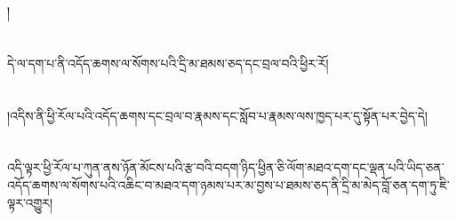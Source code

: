 །\chapter{ }དེ་ལ་དག་པ་ནི་འདོད་ཆགས་ལ་སོགས་པའི་དྲི་མ་ཐམས་ཅད་དང་བྲལ་བའི་ཕྱིར་རོ།\chapter{ }།འདིས་ནི་ཕྱི་རོལ་པའི་འདོད་ཆགས་དང་བྲལ་བ་རྣམས་དང་སློབ་པ་རྣམས་ལས་ཁྱད་པར་དུ་སྟོན་པར་བྱེད་དེ།\chapter{ }འདི་ལྟར་ཕྱི་རོལ་པ་ཀུན་ནས་ཉོན་མོངས་པའི་རྩ་བའི་བདག་ཉིད་ཕྱིན་ཅི་ལོག་མཐའ་དག་དང་ལྡན་པའི་ཡིད་ཅན་འདོད་ཆགས་ལ་སོགས་པའི་འཆིང་བ་མཐའ་དག་ཉམས་པར་མ་བྱས་པ་ཐམས་ཅད་ནི་དྲི་མ་མེད་བློ་ཅན་དག་ཏུ་ཇི་ལྟར་འགྱུར།\cha